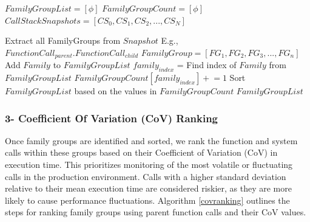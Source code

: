 \documentclass[pdflatex,sn-nature]{sn-jnl}%
\theoremstyle{thmstyleone}%
\theoremstyle{thmstyletwo}%
\theoremstyle{thmstylethree}%
\begin{document}
\begin{algorithm}[tbp]

  \caption{Family-group Identification \& Sorting}\label{familygroup}

  \begin{algorithmic}[1]
    \State $FamilyGroupList=[\phi]$
    \State $FamilyGroupCount=[\phi]$
    \State $CallStackSnapshots=[CS_0,CS_1,CS_2,...,CS_N]$

        \State Extract all FamilyGroups from $Snapshot$
        \State E.g., $FunctionCall_{parent}.FunctionCall_{child}$
        \State $FamilyGroup = [FG_1,FG_2,FG_3,...,FG_n]$
                \State Add $Family$ to $FamilyGroupList$
            \Else
                \State $family_{index}$ = Find index of $Family$ from $FamilyGroupList$
                \State $FamilyGroupCount[family_{index}] \mathrel{+}= 1$
            \EndIf
        \EndFor
    \EndFor
    \State Sort $FamilyGroupList$ based on the values in $FamilyGroupCount$
    \State \Return $FamilyGroupList$
  
  \end{algorithmic}
\end{algorithm}



\subsubsection{3- Coefficient Of Variation (CoV) Ranking}

Once family groups are identified and sorted, we rank the function and system calls within these groups based on their Coefficient of Variation (CoV) in execution time. This prioritizes monitoring of the most volatile or fluctuating calls in the production environment. Calls with a higher standard deviation relative to their mean execution time are considered riskier, as they are more likely to cause performance fluctuations. Algorithm \ref{covranking} outlines the steps for ranking family groups using parent function calls and their CoV values.
\end{document}
